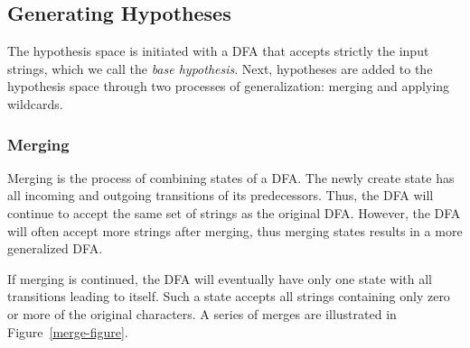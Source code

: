 \documentclass[10pt,letterpaper]{article}
\begin{document}

\subsection{Generating Hypotheses}
The hypothesis space is initiated with a DFA that accepts strictly the input strings, which we call the \emph{base hypothesis}. Next, hypotheses are added to the hypothesis space through two processes of generalization: merging and applying wildcards.

\subsubsection{Merging} Merging is the process of combining states of a DFA. The newly create state has all incoming and outgoing transitions of its predecessors. Thus, the DFA will continue to accept the same set of strings as the original DFA. However, the DFA will often accept more strings after merging, thus merging states results in a more generalized DFA.

If merging is continued, the DFA will eventually have only one state with all transitions leading to itself. Such a state accepts all strings containing only zero or more of the original characters. A series of merges are illustrated in Figure~\ref{merge-figure}.
\end{document}
